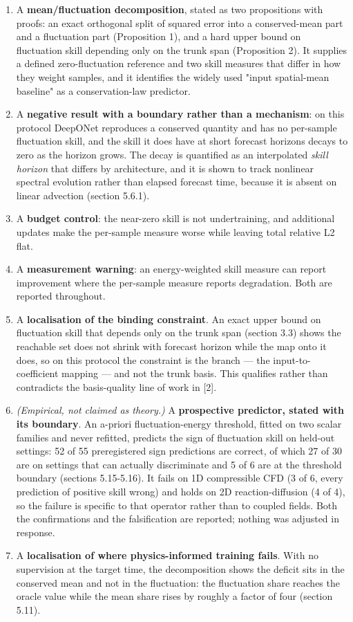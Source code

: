 \documentclass[preprint,12pt]{elsarticle}
\begin{document}
\begin{enumerate}
\item A \textbf{mean/fluctuation decomposition}, stated as two propositions with proofs: an exact orthogonal split of squared error into a conserved-mean part and a fluctuation part (Proposition 1), and a hard upper bound on fluctuation skill depending only on the trunk span (Proposition 2). It supplies a defined zero-fluctuation reference and two skill measures that differ in how they weight samples, and it identifies the widely used "input spatial-mean baseline" as a conservation-law predictor.
\item A \textbf{negative result with a boundary rather than a mechanism}: on this protocol DeepONet reproduces a conserved quantity and has no per-sample fluctuation skill, and the skill it does have at short forecast horizons decays to zero as the horizon grows. The decay is quantified as an interpolated \emph{skill horizon} that differs by architecture, and it is shown to track nonlinear spectral evolution rather than elapsed forecast time, because it is absent on linear advection (section 5.6.1).
\item A \textbf{budget control}: the near-zero skill is not undertraining, and additional updates make the per-sample measure worse while leaving total relative L2 flat.
\item A \textbf{measurement warning}: an energy-weighted skill measure can report improvement where the per-sample measure reports degradation. Both are reported throughout.
\item A \textbf{localisation of the binding constraint}. An exact upper bound on fluctuation skill that depends only on the trunk span (section 3.3) shows the reachable set does not shrink with forecast horizon while the map onto it does, so on this protocol the constraint is the branch --- the input-to-coefficient mapping --- and not the trunk basis. This qualifies rather than contradicts the basis-quality line of work in [2].
\item \emph{(Empirical, not claimed as theory.)} A \textbf{prospective predictor, stated with its boundary}. An a-priori fluctuation-energy threshold, fitted on two scalar families and never refitted, predicts the sign of fluctuation skill on held-out settings: 52 of 55 preregistered sign predictions are correct, of which 27 of 30 are on settings that can actually discriminate and 5 of 6 are at the threshold boundary (sections 5.15-5.16). It fails on 1D compressible CFD (3 of 6, every prediction of positive skill wrong) and holds on 2D reaction-diffusion (4 of 4), so the failure is specific to that operator rather than to coupled fields. Both the confirmations and the falsification are reported; nothing was adjusted in response.
\item A \textbf{localisation of where physics-informed training fails}. With no supervision at the target time, the decomposition shows the deficit sits in the conserved mean and not in the fluctuation: the fluctuation share reaches the oracle value while the mean share rises by roughly a factor of four (section 5.11).
\end{enumerate}
\end{document}
